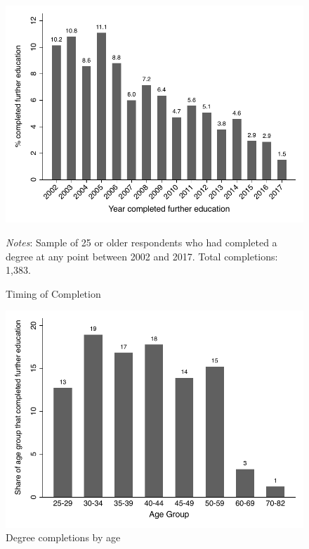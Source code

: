 \documentclass[12pt, a4paper]{article}
\begin{document}
\begin{figure}[htbp]
\centering
\caption{Timing of Completion}
\vspace{0.5cm}
  \label{fig:yearcomp}
    \includegraphics{_figures/year_completed.pdf}
    \parbox{1\textwidth}{\footnotesize{\textit{Notes}: Sample of 25 or older respondents who had completed a degree at any point between 2002 and 2017. Total completions: 1,383.}}
\end{figure}

\begin{figure}[htbp]
\centering
\caption{Degree completions by age}
\vspace{0.5cm}
  \label{fig:degbyage}
    \includegraphics{_figures/descriptive_fig3b_bw.pdf}
\end{figure}
\end{document}
